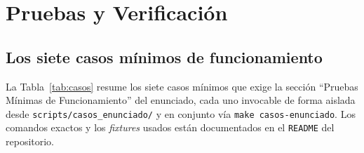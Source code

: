 \section{Pruebas y Verificación}
\label{sec:pruebas}

\subsection{Los siete casos mínimos de funcionamiento}

La Tabla~\ref{tab:casos} resume los siete casos mínimos que exige la sección
``Pruebas Mínimas de Funcionamiento'' del enunciado, cada uno invocable de
forma aislada desde \texttt{scripts/casos\_enunciado/} y en conjunto vía
\texttt{make casos-enunciado}. Los comandos exactos y los \textit{fixtures}
usados están documentados en el \texttt{README} del repositorio.


